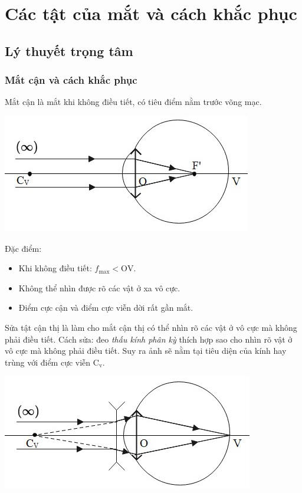 \chapter{Các tật của mắt và cách khắc phục}
\section{Lý thuyết trọng tâm}

\subsection{Mắt cận và cách khắc phục}
Mắt cận là mắt khi không điều tiết, có tiêu điểm nằm trước võng mạc.
\begin{center}
	\includegraphics[scale=0.8]{../figs/VN11-PH-40-L-028-3-h37.jpg}
\end{center}

Đặc điểm:
\begin{itemize}
	\item Khi không điều tiết: $f_\text{max}< \text{OV}$.
	\item Không thể nhìn được rõ các vật ở xa vô cực.
	\item Điểm cực cận và điểm cực viễn dời rất gần mắt.
\end{itemize}

Sửa tật cận thị là làm cho mắt cận thị có thể nhìn rõ các vật ở vô cực mà không phải điều tiết. Cách sửa: đeo \textit{thấu kính phân kỳ} thích hợp sao cho nhìn rõ vật ở vô cực mà không phải điều tiết. Suy ra ảnh sẽ nằm tại tiêu diện của kính hay trùng với điểm cực viễn $\text{C}_\text{v}$.
\begin{center}
	\includegraphics[scale=0.8]{../figs/VN11-PH-40-L-028-3-h38.jpg}
\end{center}

